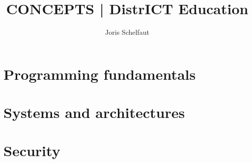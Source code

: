 \documentclass[a4paper,twoside,10pt]{book}
\title{CONCEPTS | DistrICT Education}
\author{Joris Schelfaut}
\date{}
\begin{document}
\maketitle

\cleardoublepage %
\pagestyle{plain} %


\rmfamily
\setcounter{page}{0}





\pagestyle{empty} %
\tableofcontents %

\setcounter{page}{0}


\part{Programming fundamentals}\label{part:programming-fundamentals}





%
%
%
%

\part{Systems and architectures}\label{part:systems-and-architectures}




\part{Security}\label{part:security}




\end{document}
